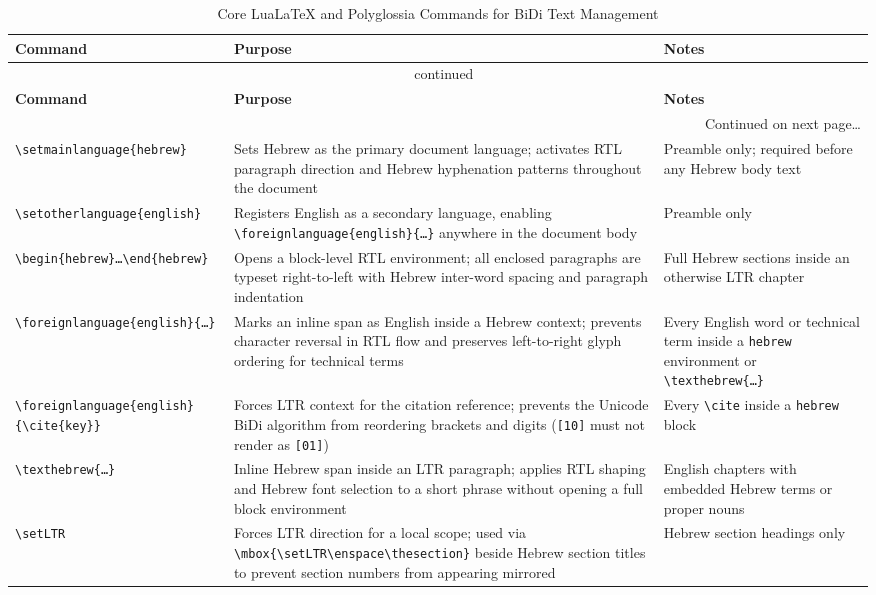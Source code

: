 \begin{longtable}{@{}p{3.8cm}p{5.8cm}p{4.0cm}@{}}
\caption{Core LuaLaTeX and Polyglossia Commands for BiDi Text Management}
\label{tab:bidi-commands}\\
\toprule
\textbf{Command} & \textbf{Purpose} & \textbf{Notes} \\
\midrule
\endfirsthead
\multicolumn{3}{c}{\tablename~\thetable{} \textemdash{} continued}\\[4pt]
\toprule
\textbf{Command} & \textbf{Purpose} & \textbf{Notes} \\
\midrule
\endhead
\midrule
\multicolumn{3}{r}{\small Continued on next page\ldots}\\
\endfoot
\bottomrule
\endlastfoot
%
\texttt{\textbackslash setmainlanguage\{hebrew\}} &
  Sets Hebrew as the primary document language; activates RTL paragraph direction
  and Hebrew hyphenation patterns throughout the document &
  Preamble only; required before any Hebrew body text \\[4pt]
%
\texttt{\textbackslash setotherlanguage\{english\}} &
  Registers English as a secondary language, enabling
  \texttt{\textbackslash foreignlanguage\{english\}\{\ldots\}}
  anywhere in the document body &
  Preamble only \\[4pt]
%
\texttt{\textbackslash begin\{hebrew\}\ldots\textbackslash end\{hebrew\}} &
  Opens a block-level RTL environment; all enclosed paragraphs are typeset
  right-to-left with Hebrew inter-word spacing and paragraph indentation &
  Full Hebrew sections inside an otherwise LTR chapter \\[4pt]
%
\texttt{\textbackslash foreignlanguage\{english\}\{\ldots\}} &
  Marks an inline span as English inside a Hebrew context;
  prevents character reversal in RTL flow and preserves
  left-to-right glyph ordering for technical terms &
  Every English word or technical term inside a
  \texttt{hebrew} environment or
  \texttt{\textbackslash texthebrew\{\ldots\}} \\[4pt]
%
\texttt{\textbackslash foreignlanguage\{english\}} \texttt{\{\textbackslash cite\{key\}\}} &
  Forces LTR context for the citation reference;
  prevents the Unicode BiDi algorithm from reordering brackets and digits
  (\texttt{[10]} must not render as \texttt{[01]}) &
  Every \texttt{\textbackslash cite} inside a \texttt{hebrew} block \\[4pt]
%
\texttt{\textbackslash texthebrew\{\ldots\}} &
  Inline Hebrew span inside an LTR paragraph;
  applies RTL shaping and Hebrew font selection to a short phrase
  without opening a full block environment &
  English chapters with embedded Hebrew terms or proper nouns \\[4pt]
%
\texttt{\textbackslash setLTR} &
  Forces LTR direction for a local scope; used via
  \texttt{\textbackslash mbox\{\textbackslash setLTR\textbackslash enspace\textbackslash thesection\}}
  beside Hebrew section titles to prevent section numbers from appearing mirrored &
  Hebrew section headings only \\[4pt]
\end{longtable}

